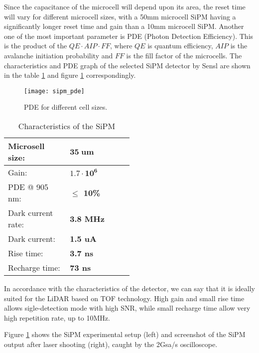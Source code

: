 Since the capacitance of the microcell will depend upon its area, the reset time will vary for different microcell sizes, with a 50mm
microcell SiPM having a significantly longer reset time and gain than a 10mm microcell SiPM.
Another one of the most important parameter is PDE (Photon Detection Efficiency). This is the product of the $QE\cdot AIP \cdot FF$, where $QE$ is quantum efficiency, $AIP$ is the avalanche initiation probability and $FF$ is the fill factor of the microcells.
The characteristics and PDE graph of the selected SiPM detector by Sensl are shown in the table \ref{tbl:sipm_characteristics} and figure \ref{fig:sipm_pde} correspondingly.


\begin{figure}[H]
\texttt{[image: sipm\_pde]}
\caption{PDE for different cell sizes.}
\label{fig:sipm_pde}
\end{figure}

\begin{table}[H]
\label{tbl:rfp_laser}
\begin{center}

\begin{tabular}{|p{0.2\linewidth}|p{0.3\linewidth}|}
\hline
Microsell size: & \textbf{$\pmb{35\; um}$}  \\ \hline
Gain: & \textbf{$\pmb{1.7 \cdot 10^6}$}  \\ \hline
PDE @ 905 nm: & \textbf{$\leq$ 10\%} \\\hline
Dark current rate: & \textbf{3.8 MHz} \\\hline
Dark current: & \textbf{1.5 uA} \\\hline
Rise time: & \textbf{3.7 ns} \\\hline
Recharge time: & \textbf{73 ns} \\  \hline
\end{tabular}
\vspace{-5mm}
\caption{Characteristics of the SiPM}
\label{tbl:sipm_characteristics}
\end{center}
\end{table}



In accordance with the characteristics of the detector, we can say that it is ideally suited for the LiDAR based on TOF technology. High gain and small rise time allows sigle-detection mode with high SNR, while small recharge time allow very high repetition rate, up to 10MHz.

Figure \ref{fig:sipm_pde} shows the SiPM experimental setup (left) and screenshot of the SiPM output after laser shooting (right), caught by the 2Gsa/s oscilloscope.


